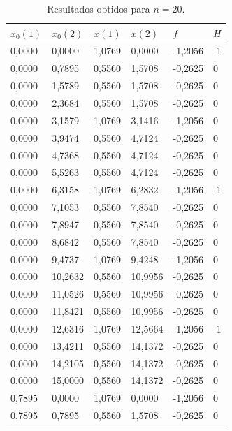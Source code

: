 \documentclass[12pt]{article}
\begin{document}
	\begin{longtable}{@{}llllll@{}} 
		
		\caption{Resultados obtidos para $ n = 20 $.} \label{resultadosCompletos} \\
		
		\toprule
		$x_0(1)$     & $x_0(2)$     & $ x(1) $      & $ x(2) $      & $ f $        & $ H $  \\ \midrule
		\endhead
		0,0000  & 0,0000  & 1,0769  & 0,0000  & -1,2056  & -1 \\
		0,0000  & 0,7895  & 0,5560  & 1,5708  & -0,2625  & 0  \\
		0,0000  & 1,5789  & 0,5560  & 1,5708  & -0,2625  & 0  \\
		0,0000  & 2,3684  & 0,5560  & 1,5708  & -0,2625  & 0  \\
		0,0000  & 3,1579  & 1,0769  & 3,1416  & -1,2056  & 0  \\
		0,0000  & 3,9474  & 0,5560  & 4,7124  & -0,2625  & 0  \\
		0,0000  & 4,7368  & 0,5560  & 4,7124  & -0,2625  & 0  \\
		0,0000  & 5,5263  & 0,5560  & 4,7124  & -0,2625  & 0  \\
		0,0000  & 6,3158  & 1,0769  & 6,2832  & -1,2056  & -1 \\
		0,0000  & 7,1053  & 0,5560  & 7,8540  & -0,2625  & 0  \\
		0,0000  & 7,8947  & 0,5560  & 7,8540  & -0,2625  & 0  \\
		0,0000  & 8,6842  & 0,5560  & 7,8540  & -0,2625  & 0  \\
		0,0000  & 9,4737  & 1,0769  & 9,4248  & -1,2056  & 0  \\
		0,0000  & 10,2632 & 0,5560  & 10,9956 & -0,2625  & 0  \\
		0,0000  & 11,0526 & 0,5560  & 10,9956 & -0,2625  & 0  \\
		0,0000  & 11,8421 & 0,5560  & 10,9956 & -0,2625  & 0  \\
		0,0000  & 12,6316 & 1,0769  & 12,5664 & -1,2056  & -1 \\
		0,0000  & 13,4211 & 0,5560  & 14,1372 & -0,2625  & 0  \\
		0,0000  & 14,2105 & 0,5560  & 14,1372 & -0,2625  & 0  \\
		0,0000  & 15,0000 & 0,5560  & 14,1372 & -0,2625  & 0  \\
		0,7895  & 0,0000  & 1,0769  & 0,0000  & -1,2056  & 0  \\
		0,7895  & 0,7895  & 0,5560  & 1,5708  & -0,2625  & 0  \\

\end{longtable}
\end{document}
